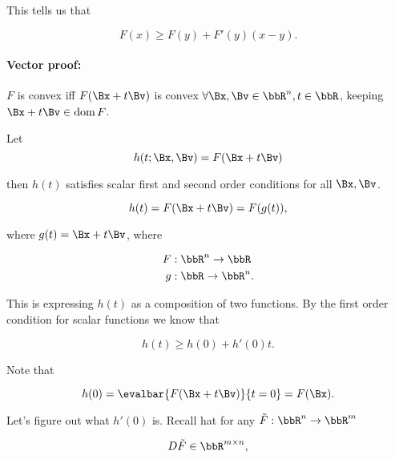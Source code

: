 This tells us that

\begin{dmath}\label{eqn:convexOptimizationLecture6:440}
F(x) \ge F(y) + F'(y)(x - y).
\end{dmath}

\paragraph{Vector proof:}

\( F \) is convex iff \( F(\Bx + t \Bv) \) is convex \( \forall \Bx,\Bv \in \bbR^n, t \in \bbR \), keeping \( \Bx + t \Bv \in \dom F\).

Let
\begin{dmath}\label{eqn:convexOptimizationLecture6:460}
h(t ; \Bx, \Bv) = F(\Bx + t \Bv)
\end{dmath}

then \( h(t) \) satisfies scalar first and second order conditions for all \( \Bx, \Bv \).

\begin{dmath}\label{eqn:convexOptimizationLecture6:480}
h(t) = F(\Bx + t \Bv) = F(g(t)),
\end{dmath}

where \( g(t) = \Bx + t \Bv \), where

\begin{dmath}\label{eqn:convexOptimizationLecture6:500}
\begin{aligned}
F &: \bbR^n \rightarrow \bbR \\
g &: \bbR \rightarrow \bbR^n.
\end{aligned}
\end{dmath}

This is expressing \( h(t) \) as a composition of two functions.  By the first order condition for scalar functions we know that

\begin{dmath}\label{eqn:convexOptimizationLecture6:520}
h(t) \ge h(0) + h'(0) t.
\end{dmath}

Note that

\begin{equation}\label{eqn:convexOptimizationLecture6:540}
h(0) = \evalbar{F(\Bx + t \Bv)}{t = 0} = F(\Bx).
\end{equation}

Let's figure out what \( h'(0) \) is.  Recall hat for any \( \tilde{F} : \bbR^n \rightarrow \bbR^m \)

\begin{equation}\label{eqn:convexOptimizationLecture6:560}
D \tilde{F} \in \bbR^{m \times n},
\end{equation}

